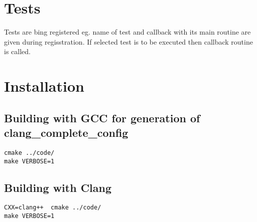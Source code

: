 \documentclass[a4paper,10pt]{article}
\begin{document}
\section{Tests}
Tests are bing registered eg. name of test and callback with its main routine are given during regisstration. 
If selected test is to be executed then callback routine is called.

\section{Installation}
\subsection{Building with GCC for generation of clang\_complete\_config}
\begin{verbatim}
cmake ../code/
make VERBOSE=1
\end{verbatim}
\subsection{Building with Clang}
\begin{verbatim}
CXX=clang++  cmake ../code/
make VERBOSE=1
\end{verbatim}
\end{document}
